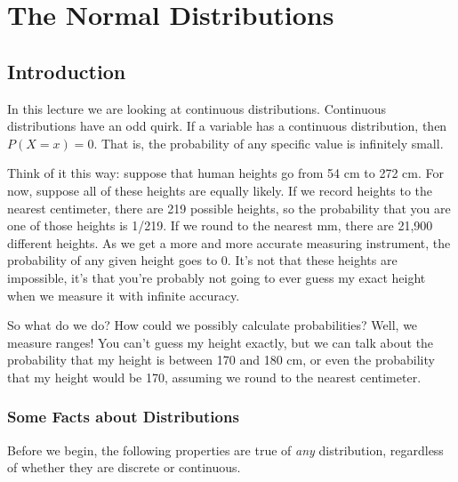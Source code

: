 \documentclass[
  letterpaper,
  DIV=11,
  numbers=noendperiod]{scrreprt}
\begin{document}
\hypertarget{the-normal-distributions}{%
\chapter{The Normal Distributions}\label{the-normal-distributions}}

\hypertarget{introduction-3}{%
\section{Introduction}\label{introduction-3}}

In this lecture we are looking at continuous distributions. Continuous
distributions have an odd quirk. If a variable has a continuous
distribution, then \(P(X = x) = 0\). That is, the probability of any
specific value is infinitely small.

Think of it this way: suppose that human heights go from 54 cm to 272
cm. For now, suppose all of these heights are equally likely. If we
record heights to the nearest centimeter, there are 219 possible
heights, so the probability that you are one of those heights is 1/219.
If we round to the nearest mm, there are 21,900 different heights. As we
get a more and more accurate measuring instrument, the probability of
any given height goes to 0. It's not that these heights are impossible,
it's that you're probably not going to ever guess my exact height when
we measure it with infinite accuracy.

So what do we do? How could we possibly calculate probabilities? Well,
we measure ranges! You can't guess my height exactly, but we can talk
about the probability that my height is between 170 and 180 cm, or even
the probability that my height would be 170, assuming we round to the
nearest centimeter.

\hypertarget{some-facts-about-distributions}{%
\subsection{Some Facts about
Distributions}\label{some-facts-about-distributions}}

Before we begin, the following properties are true of \emph{any}
distribution, regardless of whether they are discrete or continuous.
\end{document}
